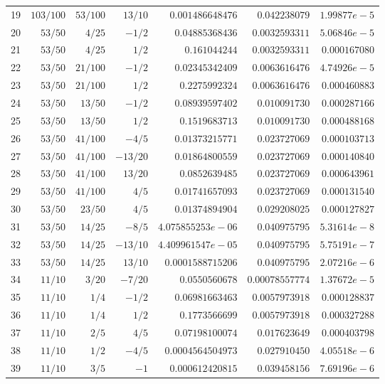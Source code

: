 \documentclass[11pt,reqno]{amsart}
\numberwithin{equation}{section}
\theoremstyle{definition}
\theoremstyle{remark}
\begin{document}
\begin{center}
\begin{longtable}{@{}rrrrrrr@{}}
19 & $103/100$ & $53/100$ & $13/10$ & $0.001486648476$ & $0.042238079$ & $1.99877e-5$\\
20 & $53/50$ & $4/25$ & $-1/2$ & $0.04885368436$ & $0.0032593311$ & $5.06846e-5$\\
21 & $53/50$ & $4/25$ & $1/2$ & $0.161044244$ & $0.0032593311$ & $0.000167080$\\
22 & $53/50$ & $21/100$ & $-1/2$ & $0.02345342409$ & $0.0063616476$ & $4.74926e-5$\\
23 & $53/50$ & $21/100$ & $1/2$ & $0.2275992324$ & $0.0063616476$ & $0.000460883$\\
24 & $53/50$ & $13/50$ & $-1/2$ & $0.08939597402$ & $0.010091730$ & $0.000287166$\\
25 & $53/50$ & $13/50$ & $1/2$ & $0.1519683713$ & $0.010091730$ & $0.000488168$\\
26 & $53/50$ & $41/100$ & $-4/5$ & $0.01373215771$ & $0.023727069$ & $0.000103713$\\
27 & $53/50$ & $41/100$ & $-13/20$ & $0.01864800559$ & $0.023727069$ & $0.000140840$\\
28 & $53/50$ & $41/100$ & $13/20$ & $0.0852639485$ & $0.023727069$ & $0.000643961$\\
29 & $53/50$ & $41/100$ & $4/5$ & $0.01741657093$ & $0.023727069$ & $0.000131540$\\
30 & $53/50$ & $23/50$ & $4/5$ & $0.01374894904$ & $0.029208025$ & $0.000127827$\\
31 & $53/50$ & $14/25$ & $-8/5$ & $4.075855253e-06$ & $0.040975795$ & $5.31614e-8$\\
32 & $53/50$ & $14/25$ & $-13/10$ & $4.409961547e-05$ & $0.040975795$ & $5.75191e-7$\\
33 & $53/50$ & $14/25$ & $13/10$ & $0.0001588715206$ & $0.040975795$ & $2.07216e-6$\\
34 & $11/10$ & $3/20$ & $-7/20$ & $0.0550560678$ & $0.00078557774$ & $1.37672e-5$\\
35 & $11/10$ & $1/4$ & $-1/2$ & $0.06981663463$ & $0.0057973918$ & $0.000128837$\\
36 & $11/10$ & $1/4$ & $1/2$ & $0.1773566699$ & $0.0057973918$ & $0.000327288$\\
37 & $11/10$ & $2/5$ & $4/5$ & $0.07198100074$ & $0.017623649$ & $0.000403798$\\
38 & $11/10$ & $1/2$ & $-4/5$ & $0.0004564504973$ & $0.027910450$ & $4.05518e-6$\\
39 & $11/10$ & $3/5$ & $-1$ & $0.000612420815$ & $0.039458156$ & $7.69196e-6$\\

\end{longtable}
\end{center}
\end{document}
